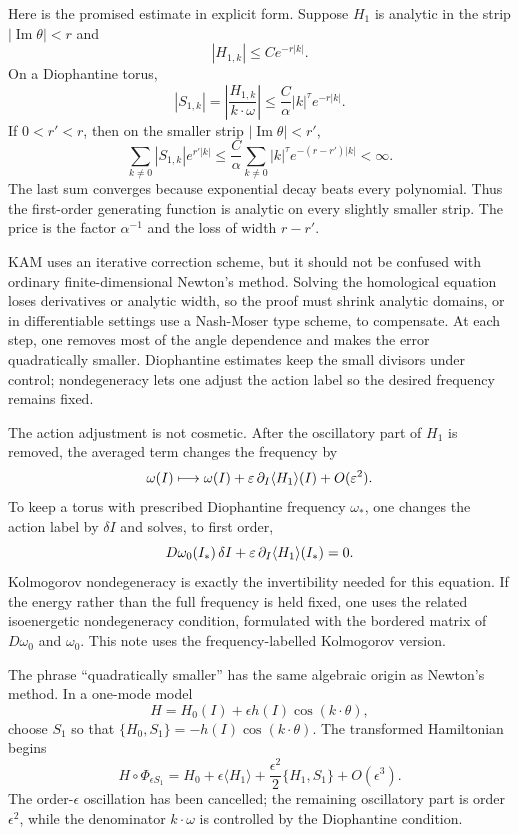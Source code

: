 Here is the promised estimate in explicit form. Suppose \(H_1\) is analytic in
the strip \(|\operatorname{Im}\theta|<r\) and
\[
  |H_{1,k}|\le C e^{-r|k|}.
\]
On a Diophantine torus,
\[
  |S_{1,k}|
  =
  \left|\frac{H_{1,k}}{k\cdot\omega}\right|
  \le
  \frac{C}{\alpha}|k|^\tau e^{-r|k|}.
\]
If \(0<r'<r\), then on the smaller strip
\(|\operatorname{Im}\theta|<r'\),
\[
  \sum_{k\neq0}|S_{1,k}|e^{r'|k|}
  \le
  \frac{C}{\alpha}
  \sum_{k\neq0}|k|^\tau e^{-(r-r')|k|}
  <\infty.
\]
The last sum converges because exponential decay beats every polynomial. Thus
the first-order generating function is analytic on every slightly smaller
strip. The price is the factor \(\alpha^{-1}\) and the loss of width
\(r-r'\).

KAM uses an iterative correction scheme, but it should not be confused with
ordinary finite-dimensional Newton's method. Solving the homological equation
loses derivatives or analytic width, so the proof must shrink analytic domains,
or in differentiable settings use a Nash-Moser type scheme, to compensate. At
each step, one removes most of the angle dependence and makes the error
quadratically smaller. Diophantine estimates keep the small divisors under
control; nondegeneracy lets one adjust the action label so the desired frequency
remains fixed.

The action adjustment is not cosmetic. After the oscillatory part of \(H_1\) is
removed, the averaged term changes the frequency by
\[
  \omega(I)\longmapsto
  \omega(I)+\varepsilon\,\partial_I\langle H_1\rangle(I)+O(\varepsilon^2).
\]
To keep a torus with prescribed Diophantine frequency \(\omega_*\), one changes
the action label by \(\delta I\) and solves, to first order,
\[
  D\omega_0(I_*)\,\delta I
  +
  \varepsilon\,\partial_I\langle H_1\rangle(I_*)
  =
  0.
\]
Kolmogorov nondegeneracy is exactly the invertibility needed for this equation.
If the energy rather than the full frequency is held fixed, one uses the related
isoenergetic nondegeneracy condition, formulated with the bordered matrix of
\(D\omega_0\) and \(\omega_0\). This note uses the frequency-labelled
Kolmogorov version.

The phrase ``quadratically smaller'' has the same algebraic origin as Newton's
method. In a one-mode model
\[
  H=H_0(I)+\epsilon h(I)\cos(k\cdot\theta),
\]
choose \(S_1\) so that
\(\{H_0,S_1\}=-h(I)\cos(k\cdot\theta)\). The transformed Hamiltonian begins
\[
  H\circ\Phi_{\epsilon S_1}
  =
  H_0+\epsilon\langle H_1\rangle
  +
  \frac{\epsilon^2}{2}\{H_1,S_1\}
  +O(\epsilon^3).
\]
The order-\(\epsilon\) oscillation has been cancelled; the remaining
oscillatory part is order \(\epsilon^2\), while the denominator
\(k\cdot\omega\) is controlled by the Diophantine condition.

